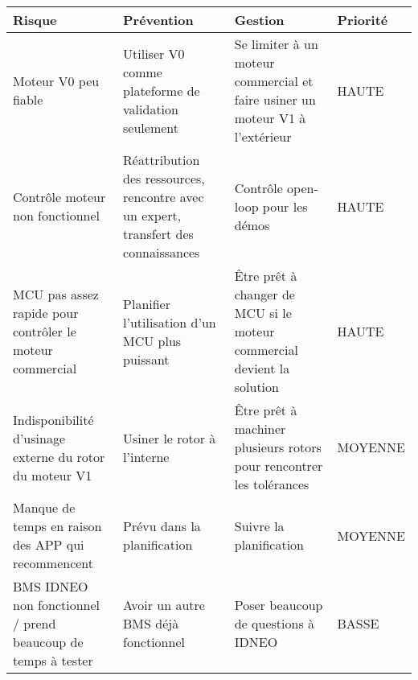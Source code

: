 \begin{tabularx}{\linewidth}{
    |>{\let\newline\\\hsize=0.40\hsize}X|%
    >{\hsize=0.25\hsize}X|%
    >{\hsize=0.25\hsize}X|%
    >{\centering\arraybackslash\hsize=0.1\hsize}X|%
  }
    \hline
    \textbf{Risque} & \textbf{Prévention} & \textbf{Gestion} & \textbf{Priorité}\\\hline
    Moteur V0 peu fiable & Utiliser V0 comme plateforme de validation seulement & Se limiter à un moteur commercial et faire usiner un moteur V1 à l'extérieur & HAUTE\\\hline
    
    Contrôle moteur non fonctionnel & Réattribution des ressources, rencontre avec un expert, transfert des connaissances & Contrôle open-loop pour les démos & HAUTE\\\hline

    MCU pas assez rapide pour contrôler le moteur commercial & Planifier l'utilisation d'un MCU plus puissant & Être prêt à changer de MCU si le moteur commercial devient la solution & HAUTE\\\hline

    Indisponibilité d'usinage externe du rotor du moteur V1 & Usiner le rotor à l'interne & Être prêt à machiner plusieurs rotors pour rencontrer les tolérances & MOYENNE\\\hline
    
    Manque de temps en raison des APP qui recommencent & Prévu dans la planification & Suivre la planification & MOYENNE\\\hline
    
    BMS IDNEO non fonctionnel / prend beaucoup de temps à tester &  Avoir un autre BMS déjà fonctionnel & Poser beaucoup de questions à IDNEO & BASSE\\\hline

\end{tabularx}



